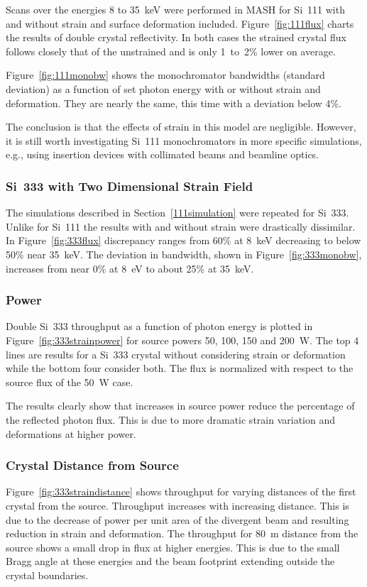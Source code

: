 \documentclass{iucr}
\begin{document}
Scans over the energies 8 to 35~keV were performed in MASH for Si~111 with and without strain and surface deformation included. Figure~\ref{fig:111flux} charts the results of double crystal reflectivity. In both cases the strained crystal flux follows closely that of the unstrained and is only 1~to~2\% lower on average.

Figure~\ref{fig:111monobw} shows the monochromator bandwidths (standard deviation) as a function of set photon energy with or without strain and deformation. They are nearly the same, this time with a deviation below 4\%.

The conclusion is that the effects of strain in this model are negligible. However, it is still worth investigating Si~111 monochromators in more specific simulations, e.g., using insertion devices with collimated beams and beamline optics.

\subsubsection{Si~333 with Two Dimensional Strain Field}\label{parameterscans}

The simulations described in Section~\ref{111simulation} were repeated for Si~333. Unlike for Si~111 the results with and without strain were drastically dissimilar. In Figure~\ref{fig:333flux} discrepancy ranges from 60\% at 8~keV decreasing to below 50\% near 35~keV. The deviation in bandwidth, shown in Figure~\ref{fig:333monobw}, increases from near 0\% at 8~eV to about 25\% at 35~keV.

\subsubsection{Power}
Double Si~333 throughput as a function of photon energy is plotted in Figure~\ref{fig:333strainpower} for source powers 50, 100, 150 and 200~W. The top 4 lines are results for a Si~333 crystal without considering strain or deformation while the bottom four consider both. The flux is normalized with respect to the source flux of the 50~W case.

The results clearly show that increases in source power reduce the percentage of the reflected photon flux. This is due to more dramatic strain variation and deformations at higher power.

\subsubsection{Crystal Distance from Source}
Figure~\ref{fig:333straindistance} shows throughput for varying distances of the first crystal from the source. Throughput increases with increasing distance. This is due to the decrease of power per unit area of the divergent beam and resulting reduction in strain and deformation. The throughput for 80~m distance from the source shows a small drop in flux at higher energies. This is due to the small Bragg angle at these energies and the beam footprint extending outside the crystal boundaries.
\end{document}
